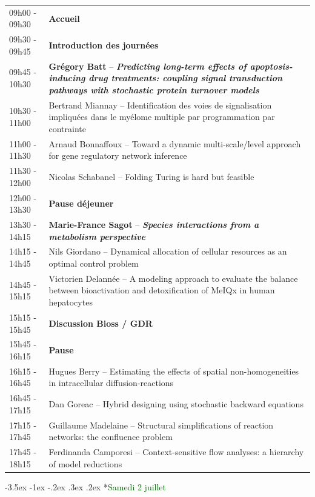 \documentclass[10pt, a4paper]{article}
\makeatletter
\renewcommand{\subsection}{\@startsection {section}{2}{\z@}%
             {-3.5ex \@plus -1ex \@minus -.2ex}%
             {.3ex \@plus.2ex}%
             {\centering\normalfont\normalsize\bfseries}}
\makeatother
\begin{document}
\begin{tabular}{p{}p{}}
	09h00 - 09h30 & \textbf{Accueil}\\[2mm]
	09h30 - 09h45 & \textbf{Introduction des journées}\\[2mm]
	09h45 - 10h30 & \textbf{Grégory Batt} -- \emph{\textbf{Predicting long-term effects of 
		apoptosis-inducing drug treatments: coupling signal transduction pathways with 
		stochastic protein turnover models}}\\[2mm]
	10h30 - 11h00 & Bertrand Miannay -- Identification des voies de signalisation impliquées 
		dans le myélome multiple par programmation par contrainte\\[1mm]
	11h00 - 11h30 & Arnaud Bonnaffoux -- Toward a dynamic multi-scale/level approach for 
		gene regulatory network inference\\[1mm]
	11h30 - 12h00 & Nicolas Schabanel -- Folding Turing is hard but feasible\\[2mm]
	12h00 - 13h30 & \textbf{Pause déjeuner}\\[2mm]
	13h30 - 14h15 & \textbf{Marie-France Sagot} -- \emph{\textbf{Species interactions from a 
		metabolism perspective}}\\[2mm]
	14h15 - 14h45 & Nils Giordano -- Dynamical allocation of cellular resources as an optimal 
		control problem\\[1mm]
	14h45 - 15h15 & Victorien Delannée -- A modeling approach to evaluate the balance 
		between bioactivation and detoxification of MeIQx in human hepatocytes\\[2mm]
	15h15 - 15h45 & \textbf{Discussion Bioss / GDR}\\[2mm]
	15h45 - 16h15 & \textbf{Pause}\\[2mm]
	16h15 - 16h45 & Hugues Berry -- Estimating the effects of spatial non-homogeneities in 
		intracellular diffusion-reactions\\[1mm]
	16h45 - 17h15 & Dan Goreac -- Hybrid designing using stochastic 
		backward equations\\[1mm]
	17h15 - 17h45 & Guillaume Madelaine -- Structural simplifications of reaction networks: the 
		confluence problem\\[1mm]
	17h45 - 18h15 & Ferdinanda Camporesi -- Context-sensitive flow analyses: a hierarchy of 
		model reductions
\end{tabular}\medskip

\subsection*{\textcolor{DarkGreen}{Samedi 2 juillet}}\medskip\medskip
\end{document}
